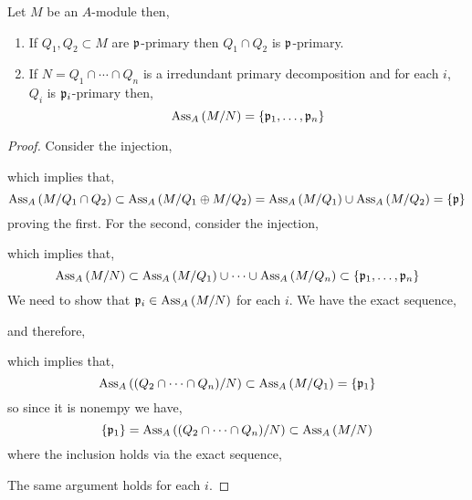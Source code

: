 \documentclass[12pt]{article}
\begin{document}
\begin{lemma}
Let $M$ be an $A$-module then,
\begin{enumerate}
\item If $Q_1, Q_2 \subset M$ are $\mathfrak{p}$-primary then $Q_1 \cap Q_2$ is $\mathfrak{p}$-primary.  

\item If $N = Q_1 \cap \cdots \cap Q_n$ is a irredundant primary decomposition and for each $i$, $Q_i$ is $\mathfrak{p}_i$-primary then,
\[ \mathrm{Ass}_{A}\left( M / N \right) = \{ \mathfrak{p}_1, \dots, \mathfrak{p}_n \} \] 
\end{enumerate}
\end{lemma}

\begin{proof}
Consider the injection,
\begin{center}
\end{center}
which implies that,
\[ \mathrm{Ass}_{A}\left( M / Q_1 \cap Q_2 \right) \subset \mathrm{Ass}_{A}\left( M / Q_1 \oplus M / Q_2 \right) = \mathrm{Ass}_{A}\left( M/Q_1 \right) \cup \mathrm{Ass}_{A}\left( M/Q_2 \right) = \{ \mathfrak{p} \} \]
proving the first.
For the second, consider the injection,
\begin{center}
\end{center}
which implies that,
\[ \mathrm{Ass}_{A}\left( M / N \right) \subset \mathrm{Ass}_{A}\left( M/Q_1 \right) \cup \cdots \cup \mathrm{Ass}_{A}\left( M/Q_n \right) \subset \{ \mathfrak{p}_1, \dots, \mathfrak{p}_n \} \]
We need to show that $\mathfrak{p}_i \in \mathrm{Ass}_{A}\left( M / N \right)$ for each $i$.
We have the exact sequence,
\begin{center}
\end{center}
and therefore,
\begin{center}
\end{center}
which implies that,
\[ \mathrm{Ass}_{A}\left( (Q_2 \cap \cdots \cap Q_n) / N \right) \subset \mathrm{Ass}_{A}\left( M / Q_1 \right) = \{ \mathfrak{p}_1 \} \]
so since it is nonempy we have,
\[ \{ \mathfrak{p}_1 \} = \mathrm{Ass}_{A}\left( (Q_2 \cap \cdots \cap Q_n) / N \right) \subset \mathrm{Ass}_{A}\left( M / N \right) \]
where the inclusion holds via the exact sequence,
\begin{center}
\end{center}
The same argument holds for each $i$. 
\end{proof}
\end{document}
